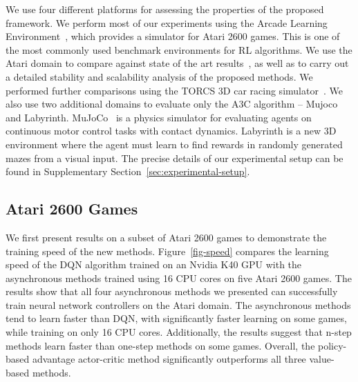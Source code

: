 \documentclass{article} \usepackage{times}
\begin{document}
We use four different platforms for assessing the properties of the proposed framework.
We perform most of our experiments using the Arcade Learning Environment~\citep{bellemare-ale}, which provides a simulator for Atari 2600 games.
This is one of the most commonly used benchmark environments for RL algorithms.
We use the Atari domain to 
compare against state of the art results~\cite{hado2015doubledqn,wang2015dueling,schaul2015prioritized,nair2015gorila,mnih-dqn-2015},
as well as to carry out a detailed stability and scalability analysis of the proposed methods.
We performed further comparisons using the TORCS 3D car racing simulator~\citep{wymann-torcs}.
We also use two additional domains to evaluate only the A3C algorithm -- Mujoco and Labyrinth.  MuJoCo~\citep{todorov-mujoco} is a physics simulator for evaluating agents on continuous motor control tasks with contact dynamics.
Labyrinth is a new 3D environment where the agent must learn to find rewards in randomly generated mazes from a visual input.
The precise details of our experimental setup can be found in Supplementary Section~\ref{sec:experimental-setup}. 




\subsection{Atari 2600 Games}

We first present results on a subset of Atari 2600 games to demonstrate the training speed of the new methods.
Figure~\ref{fig-speed} compares the learning speed of the DQN algorithm trained on an Nvidia K40 GPU with the asynchronous methods trained using 16 CPU cores on five Atari 2600 games.
The results show that all four asynchronous methods we presented can successfully train neural network controllers on the Atari domain.
The asynchronous methods tend to learn faster than DQN, with significantly faster learning on some games, while training on only 16 CPU cores.
Additionally, the results suggest that n-step methods learn faster than one-step methods on some games.
Overall, the policy-based advantage actor-critic method significantly outperforms all three value-based methods.
\end{document}
